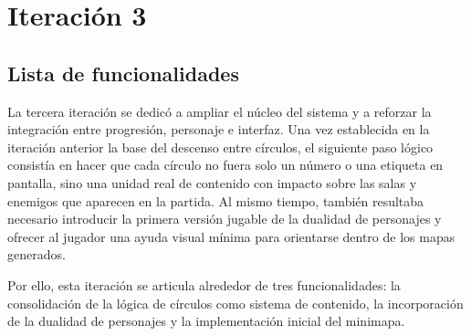 \chapter{Iteración 3}

\begin{abstract}
Esta iteración amplía la estructura del juego con sistemas que refuerzan la identidad de
la experiencia. Se desarrolla una lógica de contenidos por círculo, se incorpora la
dualidad de personajes y se introduce una primera versión del minimapa como apoyo a la
navegación.
\end{abstract}

\section{Lista de funcionalidades}
La tercera iteración se dedicó a ampliar el núcleo del sistema y a reforzar la integración
entre progresión, personaje e interfaz. Una vez establecida en la iteración anterior la
base del descenso entre círculos, el siguiente paso lógico consistía en hacer que cada
círculo no fuera solo un número o una etiqueta en pantalla, sino una unidad real de
contenido con impacto sobre las salas y enemigos que aparecen en la partida. Al mismo
tiempo, también resultaba necesario introducir la primera versión jugable de la dualidad de
personajes y ofrecer al jugador una ayuda visual mínima para orientarse dentro de los mapas
generados.

Por ello, esta iteración se articula alrededor de tres funcionalidades: la consolidación de
la lógica de círculos como sistema de contenido, la incorporación de la dualidad de
personajes y la implementación inicial del minimapa.

